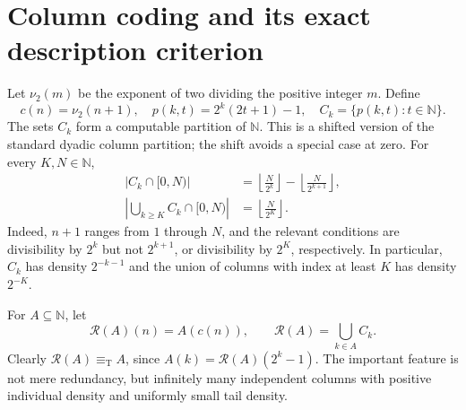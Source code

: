 \documentclass[11pt,a4paper]{article}
\newcommand{\N}{\mathbb N}
\newcommand{\eqT}{\equiv_{\mathrm T}}
\newcommand{\R}{\mathcal R}
\theoremstyle{definition}\newtheorem{definition}[theorem]{Definition}
\theoremstyle{remark}\newtheorem{remark}[theorem]{Remark}
\begin{document}
\section{Column coding and its exact description criterion}
\label{sec:columns}
Let $\nu_2(m)$ be the exponent of two dividing the positive integer $m$. Define
\begin{equation}
 c(n)=\nu_2(n+1),\quad
 p(k,t)=2^k(2t+1)-1,\quad
 C_k=\{p(k,t):t\in\N\}.
 \label{eq:columns}
\end{equation}
The sets $C_k$ form a computable partition of $\N$. This is a shifted version of the standard dyadic column partition; the shift avoids a special case at zero. For every $K,N\in\N$,
\begin{align}
 |C_k\cap[0,N)|
 &=\left\lfloor\frac{N}{2^k}\right\rfloor
   -\left\lfloor\frac{N}{2^{k+1}}\right\rfloor,\label{eq:count-column}\\
 \left|\bigcup_{k\geq K}C_k\cap[0,N)\right|
 &=\left\lfloor\frac{N}{2^K}\right\rfloor.\label{eq:count-tail}
\end{align}
Indeed, $n+1$ ranges from $1$ through $N$, and the relevant conditions are divisibility by $2^k$ but not $2^{k+1}$, or divisibility by $2^K$, respectively. In particular, $C_k$ has density $2^{-k-1}$ and the union of columns with index at least $K$ has density $2^{-K}$.

For $A\subseteq\N$, let
\begin{equation}
 \R(A)(n)=A(c(n)),\qquad
 \R(A)=\bigcup_{k\in A}C_k.
 \label{eq:R}
\end{equation}
Clearly $\R(A)\eqT A$, since $A(k)=\R(A)(2^k-1)$. The important feature is not mere redundancy, but infinitely many independent columns with positive individual density and uniformly small tail density.
\end{document}
